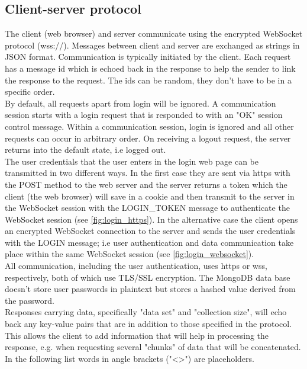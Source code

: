 \documentclass[oneside, english, final]{design}
\begin{document}
\clearpage


\subsection{Client-server protocol}
The client (web browser) and server communicate using the encrypted WebSocket protocol (wss://).
Messages between client and server are exchanged as strings in JSON format.
Communication is typically initiated by the client. Each request has a message id which is echoed back in the response to help the sender to link the response to the request. The ids can be random, they don't have to be in a specific order.
\\
By default, all requests apart from login will be ignored.  A communication session starts with a login request that is responded to with an "OK" session control message. Within a communication session, login is ignored and all other requests can occur in arbitrary order. On receiving a logout request, the server returns into the default state, i.e logged out.\\
The user credentials that the user enters in the login web page can be transmitted in two different ways.
In the first case they are sent via https with the POST method to the web server and the server returns a token which the client (the web browser) will save in a cookie and then transmit to the server in the WebSocket session with the LOGIN\_TOKEN message to authenticate the WebSocket session (see \autoref{fig:login_https}).
In the alternative case the client opens an encrypted WebSocket connection to the server and sends the user credentials with the LOGIN message; i.e user authentication and data communication take place within the same WebSocket session (see \autoref{fig:login_websocket}).\\
All communication, including the user authentication, uses https or wss, respectively, both of which use TLS/SSL encryption. The MongoDB data base doesn't store user passwords in plaintext but stores a hashed value derived from the password.\\
Responses carrying data, specifically "data set" and "collection size", will echo back any key-value pairs that are in addition to those specified in the protocol. This allows the client to add information that will help in processing the response, e.g. when requesting several "chunks" of data that will be concatenated.
\hfill
\\
In the following list words in angle brackets ("<>") are placeholders.
\end{document}
